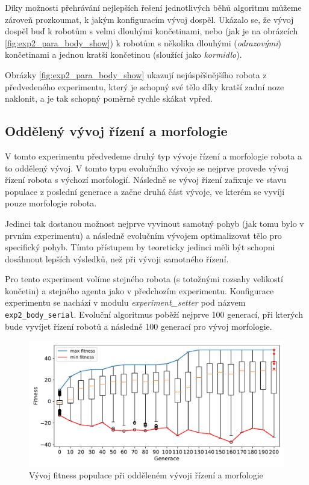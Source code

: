 \pagebreak
Díky možnosti přehrávání nejlepších řešení jednotlivých běhů algoritmu můžeme
zároveň prozkoumat, k jakým konfiguracím vývoj dospěl. Ukázalo se, že vývoj
dospěl buď k robotům s velmi dlouhými končetinami, nebo (jak je na obrázcích
\ref{fig:exp2_para_body_show}) k robotům s několika dlouhými
(\emph{odrazovými}) končetinami a jednou kratší končetinou (sloužící jako
\emph{kormidlo}). 

Obrázky \ref{fig:exp2_para_body_show} ukazují nejúspěšnějšího robota z
předvedeného experimentu, který je schopný své tělo díky kratší zadní noze
naklonit, a je tak schopný poměrně rychle skákat vpřed.

\subsection{Oddělený vývoj řízení a morfologie} \label{exp2:split_evo}

V tomto experimentu předvedeme druhý typ vývoje řízení a morfologie robota a to
oddělený vývoj. V tomto typu evolučního vývoje se nejprve provede vývoj řízení
robota s výchozí morfologií. Následně se vývoj řízení zafixuje ve stavu
populace z poslední generace a začne druhá část vývoje, ve kterém se vyvíjí
pouze morfologie robota.

Jedinci tak dostanou možnost nejprve vyvinout samotný pohyb (jak tomu bylo v
prvním experimentu) a následně evolučním vývojem optimalizovat tělo pro
specifický pohyb. Tímto přístupem by teoreticky jedinci měli být schopni
dosáhnout lepších výsledků, než při vývoji samotného řízení.

Pro tento experiment volíme stejného robota (s totožnými rozsahy velikostí
končetin) a stejného agenta jako v předchozím experimentu. Konfigurace
experimentu se nachází v modulu \emph{experiment\_setter} pod názvem
\texttt{exp2\_body\_serial}. Evoluční algoritmus poběží nejprve 100 generací,
při kterých bude vyvíjet řízení robotů a následně 100 generací pro vývoj
morfologie.

\begin{figure}[h!]
    \includegraphics[width=1\textwidth]{../img/experiment2_serial_10ticks.pdf}
    \caption{Vývoj fitness populace při odděleném vývoji řízení a morfologie}
    \label{exp:exp2_serial}
\end{figure}

